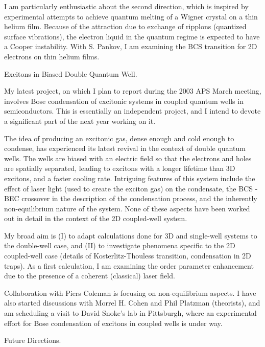 \documentclass[11pt]{article}
\newcommand{\heading}{\Large}
\begin{document}
I am particularly enthusiastic about the second direction, which is
inspired by experimental attempts to achieve quantum melting of a
Wigner crystal on a thin helium film.  Because of the attraction due
to exchange of ripplons (quantized surface vibrations), the electron
liquid in the quantum regime is expected to have a Cooper instability.
With S. Pankov, I am examining the BCS transition for 2D electrons on
thin helium films.



{\heading  Excitons in Biased Double Quantum Well}.

My latest project, on which I plan to report during the 2003 APS March
meeting, involves Bose condensation of excitonic systems in coupled
quantum wells in semiconductors.  This is essentially an independent
project, and I intend to devote a significant part of the next year
working on it.  

The idea of producing an excitonic gas, dense enough and cold enough
to condense, has experienced its latest revival in the context of
double quantum wells.  The wells are biased with an electric field so
that the electrons and holes are spatially separated, leading to
excitons with a longer lifetime than 3D excitons, and a faster cooling
rate.  Intriguing features of this system include the effect of laser
light (used to create the exciton gas) on the condensate, the BCS -
BEC crossover in the description of the condensation process, and the
inherently non-equilibrium nature of the system.  None of these
aspects have been worked out in detail in the context of the 2D
coupled-well system.

My broad aim is (I) to adapt calculations done for 3D and single-well
systems to the double-well case, and (II) to investigate phenomena
specific to the 2D coupled-well case (details of Kosterlitz-Thouless
transition, condensation in 2D traps).  As a first calculation, I am
examining the order parameter enhancement due to the presence of a
coherent (classical) laser field.

Collaboration with Piers Coleman is focusing on non-equilibrium
aspects.  I have also started discussions with Morrel H. Cohen and
Phil Platzman (theorists), and am scheduling a visit to David Snoke's
lab in Pittsburgh, where an experimental effort for Bose condensation
of excitons in coupled wells is under way.




{\heading Future Directions}.
\end{document}
